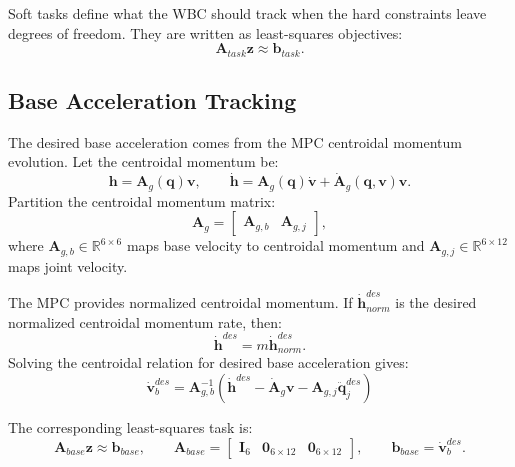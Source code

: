 \documentclass[11pt,a4paper]{article}
\newcommand{\R}{\mathbb{R}}
\begin{document}
Soft tasks define what the WBC should track when the hard constraints leave degrees of freedom. They are written as least-squares objectives:
\begin{equation}
	\bm{A}_{task}\bm{z} \approx \bm{b}_{task}.
\end{equation}

\subsection{Base Acceleration Tracking}

The desired base acceleration comes from the MPC centroidal momentum evolution. Let the centroidal momentum be:
\begin{equation}
	\bm{h}
	=
	\bm{A}_g(\bm{q})\bm{v},
	\qquad
	\dot{\bm{h}}
	=
	\bm{A}_g(\bm{q})\dot{\bm{v}}
	+
	\dot{\bm{A}}_g(\bm{q},\bm{v})\bm{v}.
\end{equation}
Partition the centroidal momentum matrix:
\begin{equation}
	\bm{A}_g
	=
	\begin{bmatrix}
		\bm{A}_{g,b} & \bm{A}_{g,j}
	\end{bmatrix},
\end{equation}
where $\bm{A}_{g,b}\in\R^{6\times6}$ maps base velocity to centroidal momentum and $\bm{A}_{g,j}\in\R^{6\times12}$ maps joint velocity.

The MPC provides normalized centroidal momentum. If
$\dot{\bm{h}}_{norm}^{des}$ is the desired normalized centroidal momentum rate, then:
\begin{equation}
	\dot{\bm{h}}^{des}
	=
	m\dot{\bm{h}}_{norm}^{des}.
\end{equation}
Solving the centroidal relation for desired base acceleration gives:
\begin{equation}
	\boxed{
		\dot{\bm{v}}_b^{des}
		=
		\bm{A}_{g,b}^{-1}
		\left(
			\dot{\bm{h}}^{des}
			-
			\dot{\bm{A}}_g\bm{v}
			-
			\bm{A}_{g,j}\ddot{\bm{q}}_j^{des}
		\right)
	}
	\label{eq:base_acc_from_centroidal}
\end{equation}

The corresponding least-squares task is:
\begin{equation}
	\bm{A}_{base}\bm{z} \approx \bm{b}_{base},
	\qquad
	\bm{A}_{base}
	=
	\begin{bmatrix}
		\bm{I}_6 & \bm{0}_{6\times12} & \bm{0}_{6\times12}
	\end{bmatrix},
	\qquad
	\bm{b}_{base}
	=
	\dot{\bm{v}}_b^{des}.
\end{equation}
\end{document}

